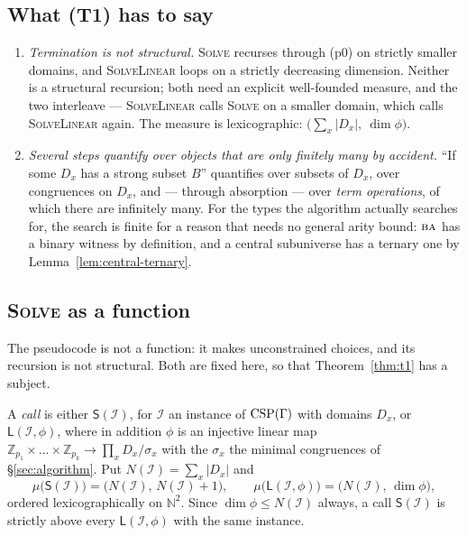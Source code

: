 \subsection{What \textup{(T1)} has to say}

\begin{hazard}
\label{haz:algorithm-obstacles}
\begin{enumerate}\alphlabels\tightlist
\item \emph{Termination is not structural.} \textsc{Solve} recurses through
  \textup{(p0)} on strictly smaller domains, and \textsc{SolveLinear} loops on
  a strictly decreasing dimension. Neither is a structural recursion; both need
  an explicit well-founded measure, and the two interleave ---
  \textsc{SolveLinear} calls \textsc{Solve} on a smaller domain, which calls
  \textsc{SolveLinear} again. The measure is lexicographic:
  $\bigl(\sum_{x}|D_{x}|,\ \dim\phi\bigr)$.
\item \emph{Several steps quantify over objects that are only finitely many by
  accident.} ``If some $D_{x}$ has a strong subset $B$'' quantifies over subsets
  of $D_{x}$, over congruences on $D_{x}$, and --- through absorption --- over
  \emph{term operations}, of which there are infinitely many. For the types the
  algorithm actually searches for, the search is finite for a reason that needs
  no general arity bound: $\textup{\textsc{ba}}$ has a binary witness by definition, and a
  central subuniverse has a ternary one by Lemma~\ref{lem:central-ternary}.
\end{enumerate}
\end{hazard}

\subsection{\textsc{Solve} as a function}

The pseudocode is not a function: it makes unconstrained choices, and its
recursion is not structural. Both are fixed here, so that
Theorem~\ref{thm:t1} has a subject.

\begin{definition}\label{def:solve-measure}
A \emph{call} is either $\mathsf S(\mathcal I)$, for $\mathcal I$ an instance
of $\operatorname{CSP}(\Gamma)$ with domains $D_{x}$, or $\mathsf L(\mathcal I,\phi)$, where
in addition $\phi$ is an injective linear map
$\mathbb Z_{p_{1}}\times\dots\times\mathbb Z_{p_{k}}\to\prod_{x}
D_{x}/\sigma_{x}$ with the $\sigma_{x}$ the minimal congruences of
\S\ref{sec:algorithm}. Put $N(\mathcal I)=\sum_{x}|D_{x}|$ and
\[
  \mu\bigl(\mathsf S(\mathcal I)\bigr)=
    \bigl(N(\mathcal I),\,N(\mathcal I)+1\bigr),
  \qquad
  \mu\bigl(\mathsf L(\mathcal I,\phi)\bigr)=
    \bigl(N(\mathcal I),\,\dim\phi\bigr),
\]
ordered lexicographically on $\mathbb N^{2}$. Since $\dim\phi\le N(\mathcal I)$
always, a call $\mathsf S(\mathcal I)$ is strictly above every
$\mathsf L(\mathcal I,\phi)$ with the same instance.
\end{definition}

